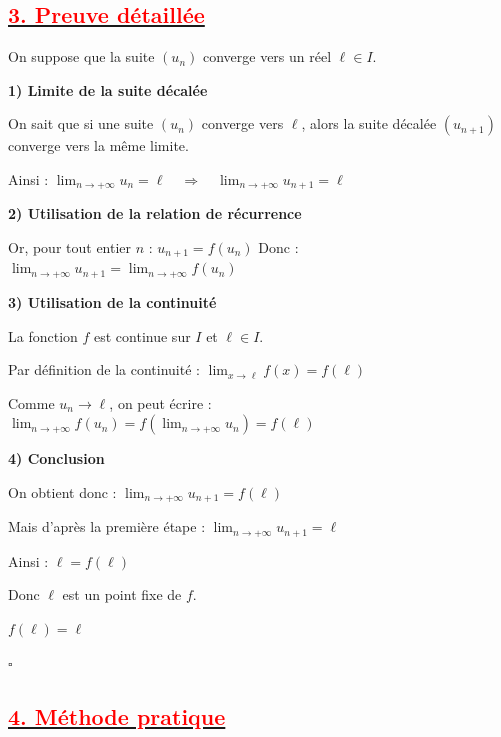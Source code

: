 \documentclass[12pt,a4paper]{article}
\begin{document}
\subsection*{\underline{\textbf{\textcolor{red}{3. Preuve détaillée}}}}

On suppose que la suite $(u_n)$ converge vers un réel $\ell \in I$.

\medskip

\textbf{1) Limite de la suite décalée}

On sait que si une suite $(u_n)$ converge vers $\ell$, alors la suite décalée $(u_{n+1})$ converge vers la même limite.

Ainsi :
\(
\lim_{n\to +\infty} u_n = \ell
\quad \Longrightarrow \quad
\lim_{n\to +\infty} u_{n+1} = \ell
\)

\medskip

\textbf{2) Utilisation de la relation de récurrence}

Or, pour tout entier $n$ :
\(
u_{n+1} = f(u_n)
\)
Donc :
\(
\lim_{n\to +\infty} u_{n+1}
=
\lim_{n\to +\infty} f(u_n)
\)

\medskip

\textbf{3) Utilisation de la continuité}

La fonction $f$ est continue sur $I$ et $\ell \in I$.

Par définition de la continuité :
\(
\lim_{x \to \ell} f(x) = f(\ell)
\)

Comme $u_n \to \ell$, on peut écrire :
\(
\lim_{n\to +\infty} f(u_n)
=
f\!\left(\lim_{n\to +\infty} u_n\right)
=
f(\ell)
\)

\medskip

\textbf{4) Conclusion}

On obtient donc :
\(
\lim_{n\to +\infty} u_{n+1}
=
f(\ell)
\)

Mais d’après la première étape :
\(
\lim_{n\to +\infty} u_{n+1} = \ell
\)

Ainsi :
\(
\ell = f(\ell)
\)

\medskip

Donc $\ell$ est un point fixe de $f$.

\(
\boxed{f(\ell)=\ell}
\)

\hfill $\square$

\vspace{0.3cm}

\subsection*{\underline{\textbf{\textcolor{red}{4. Méthode pratique}}}}
\end{document}
